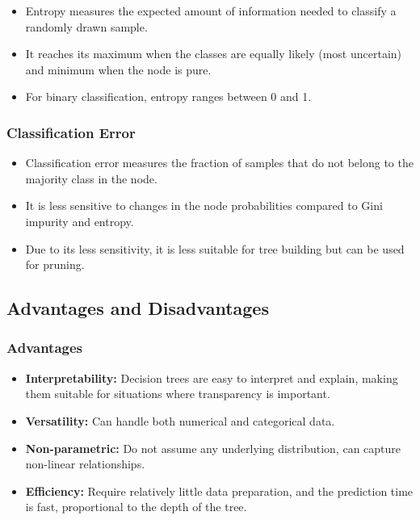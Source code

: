 \documentclass{article}
\begin{document}
\begin{itemize}
    \item Entropy measures the expected amount of information needed to classify a randomly drawn sample.
    \item It reaches its maximum when the classes are equally likely (most uncertain) and minimum when the node is pure.
    \item For binary classification, entropy ranges between 0 and 1.
\end{itemize}

\subsubsection{Classification Error}

\begin{itemize}
    \item Classification error measures the fraction of samples that do not belong to the majority class in the node.
    \item It is less sensitive to changes in the node probabilities compared to Gini impurity and entropy.
    \item Due to its less sensitivity, it is less suitable for tree building but can be used for pruning.
\end{itemize}

\subsection{Advantages and Disadvantages}

\subsubsection{Advantages}

\begin{itemize}
    \item \textbf{Interpretability:} Decision trees are easy to interpret and explain, making them suitable for situations where transparency is important.
    \item \textbf{Versatility:} Can handle both numerical and categorical data.
    \item \textbf{Non-parametric:} Do not assume any underlying distribution, can capture non-linear relationships.
    \item \textbf{Efficiency:} Require relatively little data preparation, and the prediction time is fast, proportional to the depth of the tree.
\end{itemize}
\end{document}
